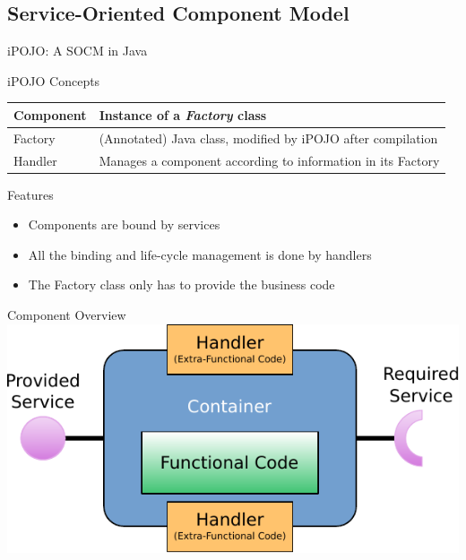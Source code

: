 \subsection{Service-Oriented Component Model}

\begin{frame}{iPOJO: A SOCM in Java}
\begin{block}{iPOJO Concepts}
\begin{tabular}{lp{}}
Component & Instance of a \textit{Factory} class\\
\hline
Factory & (Annotated) Java class, modified by iPOJO after compilation\\
\hline
Handler & Manages a component according to information in its Factory\\
\end{tabular}
\end{block}

\begin{block}{Features}
\begin{itemize}
\item Components are bound by services
\item All the binding and life-cycle management is done by handlers
\item The Factory class only has to provide the business code
\end{itemize}
\end{block}
\end{frame}

\begin{frame}{Component Overview}
\centering
\includegraphics[width=\textwidth]{../imgs/cbse_component}
\end{frame}

